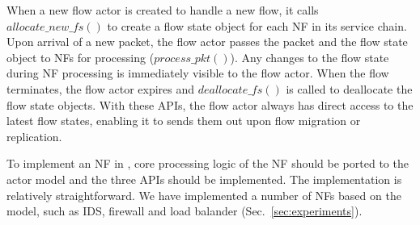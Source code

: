 When a new flow actor is created to handle a new flow, it calls $allocate\_new\_fs()$ to create a flow state object for each NF in its service chain. %
Upon arrival of a new packet, the flow actor passes the packet and the flow state object to NFs for processing ($process\_pkt()$). Any changes to the flow state during NF processing is immediately visible to the flow actor. When the flow terminates, the flow actor expires and $deallocate\_fs()$ is called to deallocate the flow state objects. With these APIs, the flow actor always has direct access to the latest flow states, enabling it to sends them out upon flow migration or replication. %





To implement an NF in \nfactor, core processing logic of the NF should be ported to the actor model and the three APIs should be implemented. The implementation is relatively straightforward. We have implemented a number of NFs based on the model, such as IDS, firewall and load balander (Sec.~\ref{sec:experiments}).


